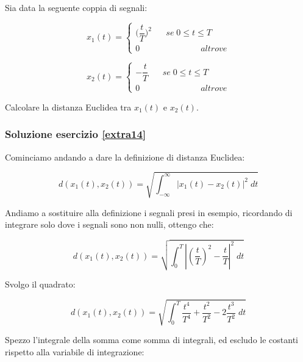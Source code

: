 \documentclass[../main.tex]{subfiles}
\begin{document}
Sia data la seguente coppia di segnali:

\begin{equation*}
x_1(t) = \begin{cases}
	\bigg(\dfrac{t}{T}\bigg)^2  \hspace{20pt} \unit{se\;} 0 \leq t \leq T \\
	0 \hspace{3cm} \unit{altrove}
\end{cases}
\end{equation*}

\begin{equation*}
x_2(t) =\begin{cases}
	 - \dfrac{t}{T}  \hspace{20pt} \unit{se\;} 0 \leq t \leq T \\
	0 \hspace{3cm} \unit{altrove}
\end{cases}
\end{equation*}

Calcolare la distanza Euclidea tra $x_1(t)$ e $x_2(t)$.


\subsubsection*{Soluzione esercizio \ref{extra14}}

Cominciamo andando a dare la definizione di distanza Euclidea:

\begin{equation}
	d(x_1(t), x_2(t)) = \sqrt{\int_{-\infty}^{\infty} |x_1(t) - x_2(t)|^2\; dt}
\end{equation}

Andiamo a sostituire alla definizione i segnali presi in esempio, ricordando di integrare solo dove i segnali sono non nulli, ottengo che:

\begin{equation}
	d(x_1(t), x_2(t)) = \sqrt{\int_{0}^{T} \left|\left(\frac{t}{T}\right)^2  - \frac{t}{T}\right|^2\; dt}
\end{equation}

Svolgo il quadrato:

\begin{equation}
	d(x_1(t), x_2(t)) = \sqrt{\int_{0}^{T}  \frac{t^4}{T^4} + \frac{t^2}{T^2} - 2 \frac{t^3}{T^2}  \; dt}
\end{equation}

Spezzo l'integrale della somma come somma di integrali, ed escludo le costanti rispetto alla variabile di integrazione:
\end{document}
